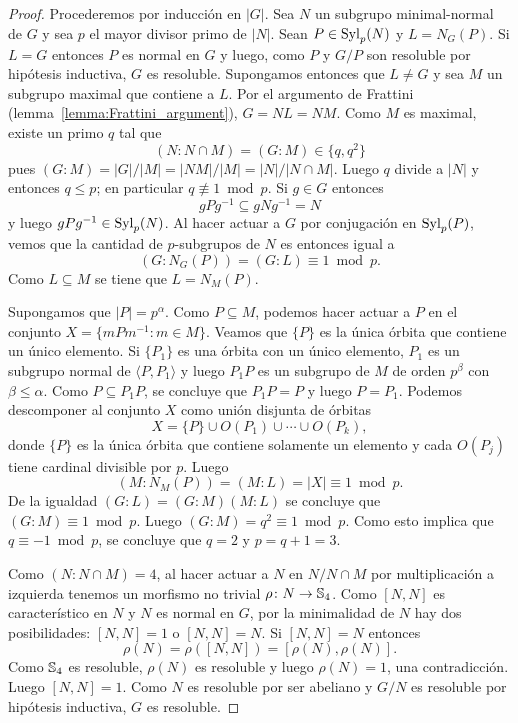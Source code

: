 \begin{proof}
	Procederemos por inducción en $|G|$. Sea $N$ un subgrupo minimal-normal de
	$G$ y sea $p$ el mayor divisor primo de $|N|$. Sean $P\in\mathrm{Syl}_p(N)$ y
	$L=N_G(P)$. Si $L=G$ entonces $P$ es normal en $G$ y luego, como $P$ y
	$G/P$ son resoluble por hipótesis inductiva, $G$ es resoluble. Supongamos
	entonces que $L\ne G$ y sea $M$ un subgrupo maximal que contiene a $L$. 
	Por el argumento de Frattini (lemma~\ref{lemma:Frattini_argument}),  
	$G=NL=NM$. Como $M$ es maximal, 
	existe un primo $q$ tal que 
	\[
	(N:N\cap M)=(G:M)\in\{q,q^2\}
	\]
	pues $(G:M)=|G|/|M|=|NM|/|M|=|N|/|N\cap M|$.  
	Luego $q$ divide a $|N|$ y entonces $q\leq p$; en particular $q\not\equiv
	1\bmod p$. Si $g\in G$ entonces 
	\[
	gPg^{-1}\subseteq gNg^{-1}=N
	\]
	y luego $gPg^{-1}\in\mathrm{Syl}_p(N)$. Al hacer actuar a $G$ por conjugación en
	$\mathrm{Syl}_p(P)$, vemos que la cantidad de $p$-subgrupos de $N$ es entonces
	igual a 
	\[
		(G:N_G(P))=(G:L)\equiv 1\bmod p.	
	\]
	Como $L\subseteq M$ se tiene que $L=N_M(P)$. 
	
	Supongamos que $|P|=p^{\alpha}$.  Como $P\subseteq M$, podemos hacer actuar
	a $P$ en el conjunto $X=\{mPm^{-1}:m\in M\}$. Veamos que $\{P\}$ es la
	única órbita que contiene un único elemento. Si $\{P_1\}$ es una órbita con
	un único elemento, $P_1$ es un subgrupo normal de $\langle P,P_1\rangle$ y
	luego $P_1P$ es un subgrupo de $M$ de orden $p^{\beta}$ con
	$\beta\leq\alpha$. Como $P\subseteq P_1P$, se concluye que $P_1P=P$ y luego
	$P=P_1$. Podemos descomponer al conjunto $X$ como unión
	disjunta de órbitas
	\[
	X=\{P\}\cup O(P_1)\cup\cdots\cup O(P_k),
	\]
	donde $\{P\}$ es la única órbita que contiene solamente un elemento y cada
	$O(P_j)$ tiene cardinal divisible por $p$. 
	Luego 
	\[
		(M:N_M(P))=(M:L)=|X|\equiv1\bmod p.
	\]
	De la igualdad $(G:L)=(G:M)(M:L)$ se concluye que $(G:M)\equiv1\bmod p$.
	Luego $(G:M)=q^2\equiv 1\bmod p$. Como esto implica que $q\equiv -1\bmod
	p$, se concluye que $q=2$ y $p=q+1=3$.

	Como $(N:N\cap M)=4$, al hacer actuar a $N$ en $N/N\cap M$ por
	multiplicación a izquierda tenemos un morfismo no trivial $\rho\colon
	N\to\mathbb{S}_4$. Como $[N,N]$ es característico en $N$ y $N$ es normal en $G$,
	por la minimalidad de $N$ hay dos posibilidades: $[N,N]=1$ o
	$[N,N]=N$. Si $[N,N]=N$ entonces
	\[
	\rho(N)=\rho([N,N])=[\rho(N),\rho(N)].
	\]
	Como $\mathbb{S}_4$ es resoluble, $\rho(N)$ es resoluble y luego $\rho(N)=1$, una
	contradicción. Luego $[N,N]=1$. Como $N$ es resoluble por ser abeliano
	y $G/N$ es resoluble por hipótesis inductiva, $G$ es resoluble.
\end{proof}

